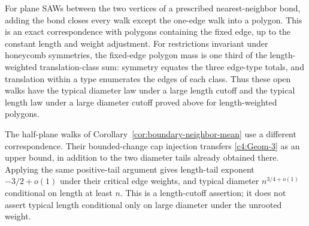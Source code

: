 For plane SAWs between the two vertices of a prescribed nearest-neighbor
bond, adding the bond closes every walk except the one-edge walk into
a polygon. This is
an exact correspondence with polygons containing the fixed edge, up to
the constant length and weight adjustment. For restrictions invariant
under honeycomb symmetries, the fixed-edge polygon mass is one third of
the length-weighted translation-class sum: symmetry equates the three
edge-type totals, and translation within a type enumerates the edges
of each class. Thus these open walks have the typical diameter law under
a large length cutoff and the typical length law under a large diameter
cutoff proved above for length-weighted polygons.

The half-plane walks of Corollary~\ref{cor:boundary-neighbor-mean} use a
different correspondence. Their bounded-change cap injection transfers
\eqref{c4:Geom-3} as an upper bound, in addition to the two diameter tails
already obtained there. Applying the same positive-tail argument gives
length-tail exponent $-3/2+o(1)$ under their critical edge weights,
and typical diameter $n^{3/4+o(1)}$ conditional on length at least $n$.
This is a length-cutoff assertion; it does not assert typical length
conditional only on large diameter under the unrooted weight.
